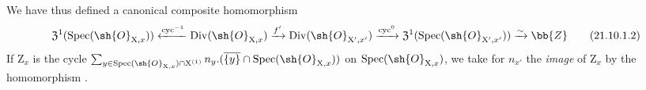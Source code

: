 \begin{env}[21.10.1]
\begin{enumerate}[label=\arabic*\textsuperscript{o}]
\end{enumerate}
We have thus defined a canonical composite homomorphism
\[
\label{IV.21.10.1.2}
  \mathfrak{Z}^1(\operatorname{Spec}(\sh{O}_{\mathrm{X},x})) \xleftarrow{\operatorname{cyc}^{-1}} \operatorname{Div}(\sh{O}_{\mathrm{X},x}) \xrightarrow{f'} \operatorname{Div}(\sh{O}_{\mathrm{X}',x'}) \xrightarrow{\operatorname{cyc}^0} \mathfrak{Z}^1(\operatorname{Spec}(\sh{O}_{\mathrm{X}',x'})) \xrightarrow{\sim} \bb{Z}
  \tag{21.10.1.2}
\]
If $\mathrm{Z}_x$ is the cycle $\sum_{y\in\operatorname{Spec}(\sh{O}_{\mathrm{X},x})\cap\mathrm{X}^{(1)}} n_y.(\overline{\{y\}}\cap\operatorname{Spec}(\sh{O}_{\mathrm{X},x}))$ on $\operatorname{Spec}(\sh{O}_{\mathrm{X},x})$, we take for $n_{x'}$ the \emph{image} of $\mathrm{Z}_x$ by the homomorphism .
\end{env}

